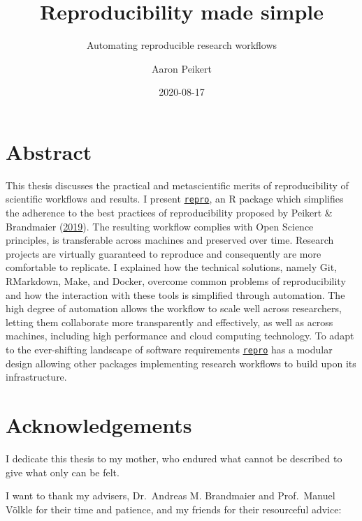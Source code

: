 \documentclass[12pt,a4paper,twoside]{article}
\title{Reproducibility made simple}
\subtitle{Automating reproducible research workflows}
\author{Aaron Peikert}
\date{2020-08-17}
\begin{document}
\maketitle

{
\setcounter{tocdepth}{2}
\tableofcontents
}
\newpage\null\thispagestyle{empty}\newpage

\hypertarget{abstract}{%
\section*{Abstract}\label{abstract}}

This thesis discusses the practical and metascientific merits of reproducibility of scientific workflows and results. I present \href{https://github.com/aaronpeikert/repro}{\texttt{repro}}, an R package which simplifies the adherence to the best practices of reproducibility proposed by Peikert \& Brandmaier (\protect\hyperlink{ref-peikertReproducibleDataAnalysis2019}{2019}).
The resulting workflow complies with Open Science principles, is transferable across machines and preserved over time.
Research projects are virtually guaranteed to reproduce and consequently are more comfortable to replicate.
I explained how the technical solutions, namely Git, RMarkdown, Make, and Docker, overcome common problems of reproducibility and how the interaction with these tools is simplified through automation.
The high degree of automation allows the workflow to scale well across researchers, letting them collaborate more transparently and effectively, as well as across machines, including high performance and cloud computing technology.
To adapt to the ever-shifting landscape of software requirements \href{https://github.com/aaronpeikert/repro}{\texttt{repro}} has a modular design allowing other packages implementing research workflows to build upon its infrastructure.

\hypertarget{acknowledgements}{%
\section*{Acknowledgements}\label{acknowledgements}}

I dedicate this thesis to my mother, who endured what cannot be described to give what only can be felt.

I want to thank my advisers, Dr.~Andreas M. Brandmaier and Prof.~Manuel Völkle for their time and patience, and my friends for their resourceful advice:
\end{document}
